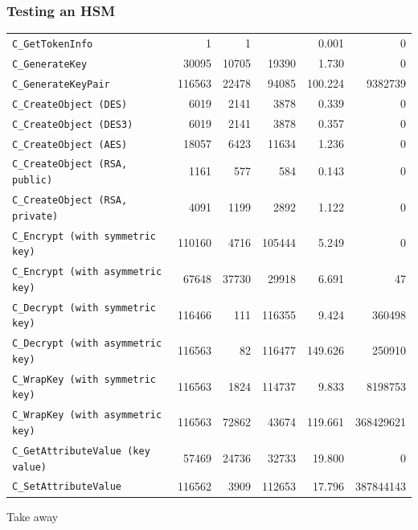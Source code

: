 \documentclass[10pt]{beamer}
\begin{document}
\begin{frame}[fragile]
  \frametitle{Testing an HSM}
\begin{scriptsize}
\begin{tabular}{|l|r|r|r|r|r|}
\hline
\verb!C_GetTokenInfo!                  &      1 &      1 &        &      0.001 &         0\\
\verb!C_GenerateKey!                   &  30095 &  10705 &  19390 &      1.730 &         0\\
\verb!C_GenerateKeyPair!               & 116563 &  22478 &  94085 &    100.224 &   9382739\\
\verb!C_CreateObject (DES)!            &   6019 &   2141 &   3878 &      0.339 &         0\\
\verb!C_CreateObject (DES3)!           &   6019 &   2141 &   3878 &      0.357 &         0\\
\verb!C_CreateObject (AES)!            &  18057 &   6423 &  11634 &      1.236 &         0\\
\verb!C_CreateObject (RSA, public)!    &   1161 &    577 &    584 &      0.143 &         0\\
\verb!C_CreateObject (RSA, private)!   &   4091 &   1199 &   2892 &      1.122 &         0\\
\verb!C_Encrypt (with symmetric key)!  & 110160 &   4716 & 105444 &      5.249 &         0\\
\verb!C_Encrypt (with asymmetric key)! &  67648 &  37730 &  29918 &      6.691 &        47\\
\verb!C_Decrypt (with symmetric key)!  & 116466 &    111 & 116355 &      9.424 &    360498\\
\verb!C_Decrypt (with asymmetric key)! & 116563 &     82 & 116477 &    149.626 &    250910\\
\verb!C_WrapKey (with symmetric key)!  & 116563 &   1824 & 114737 &      9.833 &   8198753\\
\verb!C_WrapKey (with asymmetric key)! & 116563 &  72862 &  43674 &    119.661 & 368429621\\
\verb!C_GetAttributeValue (key value)! &  57469 &  24736 &  32733 &     19.800 &         0\\
\verb!C_SetAttributeValue!             & 116562 &   3909 & 112653 &     17.796 & 387844143\\
\hline
\end{tabular}
\end{scriptsize}



\end{frame}

\begin{frame}{Take away}


\end{frame}

\end{document}
